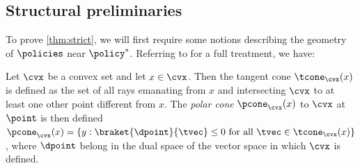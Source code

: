 





\subsection{Structural preliminaries}

To prove \cref{thm:strict}, we will first require some notions describing the geometry of $\policies$ near $\eq$.
Referring to \cite{RW98} for a full treatment, we have:

\begin{definition}
Let $\cvx$ be a convex set and let $x\in \cvx$.
Then the tangent cone $\tcone_{\cvx}(x)$ is defined as the set of all rays emanating from $x$ and intersecting $\cvx$ to at least one other point different from $x$. The \textit{polar cone} $\pcone_{\cvx}(x)$ to $\cvx$ at $\point$ is then defined $\pcone_{\cvx}(x) = \braces{y: \braket{\dpoint}{\tvec} \leq 0 \text{ for all } \tvec\in \tcone_{\cvx}(x)}$, where $\dpoint$ belong in the dual space of the vector space in which $\cvx$ is defined.
\end{definition}

